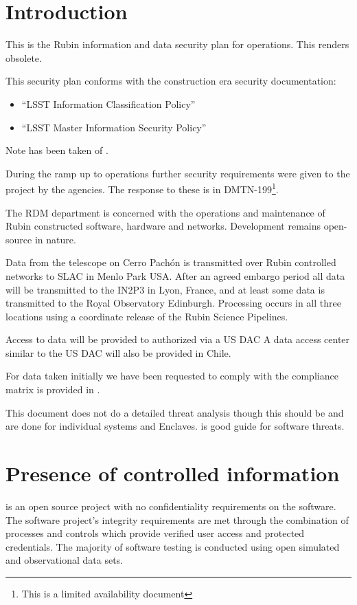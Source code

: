 

\section{Introduction}
This is the Rubin information and data security plan for operations.
This renders  obsolete.

This security plan conforms with the construction era security documentation:
\begin{itemize}
\item “LSST Information Classification Policy” 
\item “LSST Master Information Security Policy” 
\end{itemize}

Note has been taken of \cite{TCISSG}.

During the ramp up to operations further security requirements were given to the project by the agencies.
The response to these is in \gls{DMTN}-199\footnote{This is a limited availability document}.

The \gls{RDM} department is concerned with the operations and maintenance  of Rubin constructed software, hardware and networks.
Development remains open-source in nature.

Data from the telescope on Cerro Pach\'{o}n is transmitted over Rubin controlled networks to \gls{SLAC} in  Menlo Park USA.
After an agreed embargo period all data will be transmitted to the \gls{IN2P3} in Lyon, France, and at least some data is transmitted to the Royal Observatory Edinburgh.
Processing occurs in all three locations using a coordinate release of the Rubin \gls{Science Pipelines}.

Access to data will be provided to authorized via a US \gls{DAC}
A data access center similar to the \gls{US} \gls{DAC} will also be provided in Chile.

For data taken initially we have been requested to comply with  the compliance matrix is provided in  .


This document does not do a detailed threat analysis though this should be and are done for individual systems and \gls{Enclave}s. \cite{TCISSG} is good guide for software threats.

\section{Presence of controlled information}\label{sec:cui}
\VRO is an open source project with no confidentiality requirements on the software.
The software project’s integrity requirements are met through the combination of
processes and controls which provide verified user access and protected credentials.
The majority of software testing is conducted using open simulated and observational data sets.

